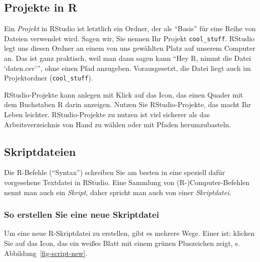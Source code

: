 \documentclass[
  letterpaper,
]{scrbook}
\theoremstyle{definition}
\theoremstyle{definition}
\theoremstyle{definition}
\theoremstyle{remark}
\begin{document}
\subsection{Projekte in R}\label{projekte-in-r}

Ein \emph{Projekt} in RStudio ist letztlich ein Ordner, der als
\enquote{Basis} für eine Reihe von Dateien verwendet wird. Sagen wir,
Sie nennen Ihr Projekt \texttt{cool\_stuff}. RStudio legt uns diesen
Ordner an einem von uns gewählten Platz auf unserem Computer an. Das ist
ganz praktisch, weil man dann sagen kann \enquote{Hey R, nimmt die Datei
\enquote*{daten.csv}}, ohne einen Pfad anzugeben. Vorausgesetzt, die
Datei liegt auch im Projektordner (\texttt{cool\_stuff}).

RStudio-Projekte kann anlegen mit Klick auf das Icon, das einen Quader
mit dem Buchstaben R darin anzeigen. Nutzen Sie RStudio-Projekte, das
macht Ihr Leben leichter. RStudio-Projekte zu nutzen ist viel sicherer
als das Arbeitsverzeichnis von Hand zu wählen oder mit Pfaden
herumzubasteln.

\subsection{Skriptdateien}\label{skriptdateien}

Die R-Befehle (\enquote{Syntax}) schreiben Sie am besten in eine
speziell dafür vorgesehene Textdatei in RStudio. Eine Sammlung von
(R-)Computer-Befehlen nennt man auch ein \emph{Skript}, daher spricht
man auch von einer \emph{Skriptdatei}.

\subsubsection{So erstellen Sie eine neue
Skriptdatei}\label{so-erstellen-sie-eine-neue-skriptdatei}

Um eine neue R-Skriptdatei zu erstellen, gibt es mehrere Wege. Einer
ist: klicken Sie auf das Icon, das ein weißes Blatt mit einem grünen
Pluszeichen zeigt, s. Abbildung~\ref{fig-script-new}.
\end{document}

